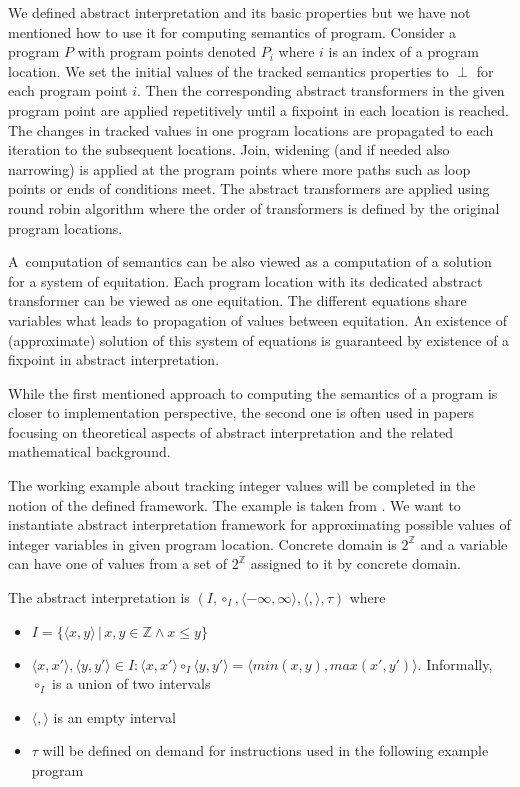 \documentclass[a4paper, 12pt]{article}
\newcommand{\interval}[2]{\langle #1,#2 \rangle}
\newcommand{\ainf}[0]{\perp}
\newcommand{\atrans}[0]{\tau}
\newcommand{\ajoin}[0]{\circ}
\newcommand{\intg}[0]{\mathbb{Z}}
\newcommand{\iintg}[0]{I}
\newcommand{\ijoin}[0]{\ajoin_\iintg}
\begin{document}
We defined abstract interpretation and its basic properties
but we have not mentioned how to use it for computing
semantics of program.
Consider a program $P$ with program points denoted $P_i$
where $i$ is an index of a program location.
We set the initial values of the tracked semantics properties
to $\ainf$ for each program point $i$.
Then the corresponding abstract transformers in the given program point
are applied repetitively until a fixpoint in each location is reached.
The changes in tracked values in one program locations are propagated to each
iteration to the subsequent locations.
Join, widening (and if needed also narrowing) is applied at the program points
where more paths such as loop points or ends of conditions meet.
The abstract transformers are applied using round robin algorithm where
the order of transformers is defined by the original program locations.

A~computation of semantics can be also viewed as a computation of
a solution for a system of equitation.
Each program location with its dedicated abstract transformer can be viewed
as one equitation.
The different equations share variables what leads to propagation
of values between equitation.
An existence of (approximate) solution of this system of equations
is guaranteed by existence of a fixpoint in abstract interpretation.

While the first mentioned approach to computing the semantics of a program is
closer to implementation perspective, the second one is often used in papers
focusing on theoretical aspects of abstract interpretation and
the related mathematical background.

\bexmp
The working example about tracking integer values will be completed
in the notion of the defined framework.
The example is taken from \cite{popl77}.
We want to instantiate abstract interpretation framework for approximating
possible values of integer variables in given program location.
Concrete domain is $2^\mathbb{\intg}$ and a variable can have one of values
from a set of $2^\mathbb{\intg}$ assigned to it by concrete domain.

The abstract interpretation is $(\iintg, \ijoin, \interval{-\infty}{\infty}, \interval{}{}, \atrans)$ where 
\begin{itemize}
	\item $\iintg = \{\interval{x}{y} \,|\, x,y \in \intg \wedge x \leq y\}$
	\item $\interval{x}{x'}, \interval{y}{y'} \in \iintg: \interval{x}{x'} \ijoin \interval{y}{y'}
		= \interval{min(x,y)}{max(x',y')}$. Informally, $\ijoin$ is a union of two intervals
	\item $\interval{}{}$ is an empty interval
	\item $\atrans$ will be defined on demand for instructions used in the following example program
\end{itemize}
\end{document}
